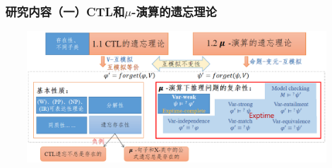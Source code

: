 \documentclass[aspectratio=1610, 9pt, CJK]{beamer}
\begin{document}
\begin{frame}  
	\frametitle{~研究内容（一）CTL和$\mu$-演算的遗忘理论}
	\begin{figure}
		\includegraphics[scale=0.45]{figures/ctlMuForgFrame31}
	\end{figure}
\end{frame}
\end{document}

